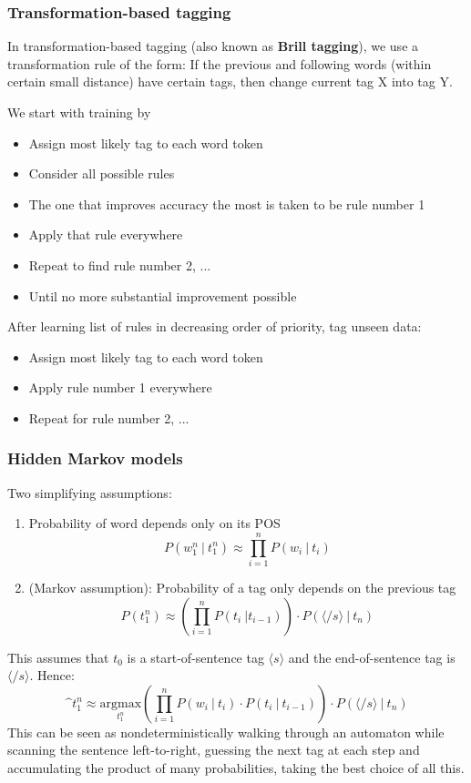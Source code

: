 \documentclass[Report.tex]{subfiles}
\begin{document}
\subsubsection{Transformation-based tagging}
In transformation-based tagging (also known as \textbf{Brill tagging}), we
use a transformation rule of the form: If the previous and following words
(within certain small distance) have certain tags, then change current tag X 
into tag Y.

We start with training by
\begin{itemize}
\item Assign most likely tag to each word token
\item Consider all possible rules
\item The one that improves accuracy the most is taken to be rule number 1
\item Apply that rule everywhere
\item Repeat to find rule number 2, ...
\item Until no more substantial improvement possible
\end{itemize}
After learning list of rules in decreasing order of priority, tag
unseen data:
\begin{itemize}
\item Assign most likely tag to each word token
\item Apply rule number 1 everywhere
\item Repeat for rule number 2, ...
\end{itemize}

\subsubsection{Hidden Markov models}
Two simplifying assumptions:
\begin{enumerate}
\item Probability of word depends only on its POS
\begin{equation}
P(w^n_1\ |\ t^n_1) \approx \prod^n_{i=1}P(w_i\ |\ t_i)
\end{equation}
\item (Markov assumption): Probability of a tag only depends on the previous tag
\begin{equation}
P(t^n_1) \approx \left(\prod^n_{i=1}P(t_i\ | t_{i-1})\right) \cdot P(\langle /s \rangle\ |\  t_n)
\end{equation}
\end{enumerate}
This assumes that $t_0$ is a start-of-sentence tag $\langle s \rangle$ and the
end-of-sentence tag is $\langle /s \rangle$. Hence:
\begin{equation}
\^{t}^n_1 \approx \underset{t^n_1}{\text{argmax}}\left(\prod^n_{i=1} P(w_i\ |\ t_i) \cdot P(t_i\ |\ t_{i-1}) \right) \cdot P(\langle /s \rangle\ |\ t_n)
\end{equation}
This can be seen as nondeterministically walking through an automaton
while scanning the sentence left-to-right, guessing the next tag at each
step and accumulating the product of many probabilities, taking the best choice
of all this.
\end{document}
